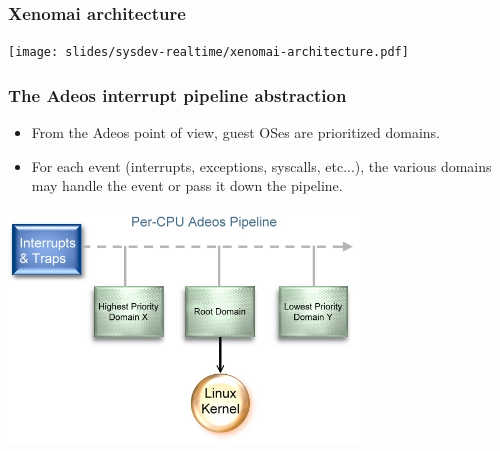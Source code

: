 \begin{frame}
  \frametitle{Xenomai architecture}
  \begin{center}
    \texttt{[image: slides/sysdev-realtime/xenomai-architecture.pdf]}
  \end{center}
\end{frame}

\begin{frame}
  \frametitle{The Adeos interrupt pipeline abstraction}
  \begin{itemize}
  \item From the Adeos point of view, guest OSes are prioritized
    domains.
  \item For each event (interrupts, exceptions, syscalls, etc...), the
    various domains may handle the event or pass it down the pipeline.
  \end{itemize}
  \begin{center}
    \includegraphics[width=0.7\textwidth]{slides/sysdev-realtime/adeos-interrupt-pipeline1.jpg}
  \end{center}
\end{frame}

